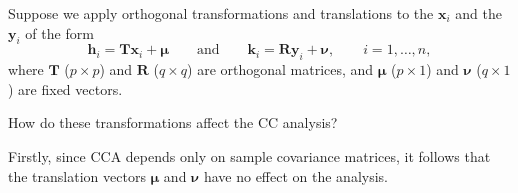 \documentclass[
]{book}
\theoremstyle{definition}
\theoremstyle{definition}
\theoremstyle{definition}
\theoremstyle{definition}
\theoremstyle{remark}
\begin{document}
Suppose we apply orthogonal transformations and translations to the \(\mathbf x_i\) and the \(\mathbf y_i\) of the form
\begin{equation}
{\mathbf h}_i={\mathbf T}\mathbf x_i + {\pmb \mu} \qquad \text{and} \qquad {\mathbf k}_i={\mathbf R}\mathbf y_i +{\pmb \nu},
\qquad i=1,\ldots , n,
\label{eq:transformations}
\end{equation}
where \(\mathbf T\) (\(p \times p\)) and \(\mathbf R\) (\(q \times q\)) are orthogonal matrices, and \(\pmb \mu\) (\(p \times 1\)) and
\(\pmb \nu\) (\(q \times 1\)) are fixed vectors.

How do these transformations affect the CC analysis?

Firstly, since CCA depends only on sample covariance matrices, it follows that the translation vectors \(\pmb \mu\) and \(\pmb \nu\) have no effect on the analysis.
\end{document}
